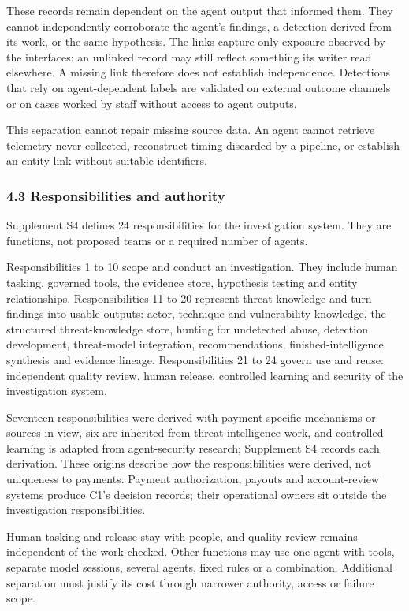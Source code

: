\documentclass[
  11pt,
]{article}
\begin{document}
These records remain dependent on the agent output that informed them.
They cannot independently corroborate the agent's findings, a detection
derived from its work, or the same hypothesis. The links capture only
exposure observed by the interfaces: an unlinked record may still
reflect something its writer read elsewhere. A missing link therefore
does not establish independence. Detections that rely on agent-dependent
labels are validated on external outcome channels or on cases worked by
staff without access to agent outputs.

This separation cannot repair missing source data. An agent cannot
retrieve telemetry never collected, reconstruct timing discarded by a
pipeline, or establish an entity link without suitable identifiers.

\hypertarget{responsibilities-and-authority}{%
\subsubsection{4.3 Responsibilities and
authority}\label{responsibilities-and-authority}}

Supplement S4 defines 24 responsibilities for the investigation system.
They are functions, not proposed teams or a required number of agents.

Responsibilities 1 to 10 scope and conduct an investigation. They
include human tasking, governed tools, the evidence store, hypothesis
testing and entity relationships. Responsibilities 11 to 20 represent
threat knowledge and turn findings into usable outputs: actor, technique
and vulnerability knowledge, the structured threat-knowledge store,
hunting for undetected abuse, detection development, threat-model
integration, recommendations, finished-intelligence synthesis and
evidence lineage. Responsibilities 21 to 24 govern use and reuse:
independent quality review, human release, controlled learning and
security of the investigation system.

Seventeen responsibilities were derived with payment-specific mechanisms
or sources in view, six are inherited from threat-intelligence work, and
controlled learning is adapted from agent-security research; Supplement
S4 records each derivation. These origins describe how the
responsibilities were derived, not uniqueness to payments. Payment
authorization, payouts and account-review systems produce C1's decision
records; their operational owners sit outside the investigation
responsibilities.

Human tasking and release stay with people, and quality review remains
independent of the work checked. Other functions may use one agent with
tools, separate model sessions, several agents, fixed rules or a
combination. Additional separation must justify its cost through
narrower authority, access or failure scope.
\end{document}
